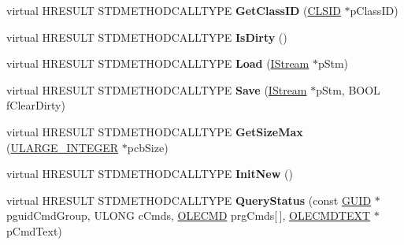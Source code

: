 \begin{DoxyCompactItemize}
virtual H\+R\+E\+S\+U\+LT S\+T\+D\+M\+E\+T\+H\+O\+D\+C\+A\+L\+L\+T\+Y\+PE {\bfseries Get\+Class\+ID} (\hyperlink{struct___i_i_d}{C\+L\+S\+ID} $\ast$p\+Class\+ID)
\item 
\mbox{\label{class_c_internet_toolbar_ae67d82daafd8635e99e35d1462e8556f}} 
virtual H\+R\+E\+S\+U\+LT S\+T\+D\+M\+E\+T\+H\+O\+D\+C\+A\+L\+L\+T\+Y\+PE {\bfseries Is\+Dirty} ()
\item 
\mbox{\label{class_c_internet_toolbar_a22c59293a91e78bcc59cdca388ca7ef0}} 
virtual H\+R\+E\+S\+U\+LT S\+T\+D\+M\+E\+T\+H\+O\+D\+C\+A\+L\+L\+T\+Y\+PE {\bfseries Load} (\hyperlink{interface_i_stream}{I\+Stream} $\ast$p\+Stm)
\item 
\mbox{\label{class_c_internet_toolbar_a1ae6e783bfb6a0529b7b99883f628749}} 
virtual H\+R\+E\+S\+U\+LT S\+T\+D\+M\+E\+T\+H\+O\+D\+C\+A\+L\+L\+T\+Y\+PE {\bfseries Save} (\hyperlink{interface_i_stream}{I\+Stream} $\ast$p\+Stm, B\+O\+OL f\+Clear\+Dirty)
\item 
\mbox{\label{class_c_internet_toolbar_ace9c52cd95b0420400b2323a06ad8465}} 
virtual H\+R\+E\+S\+U\+LT S\+T\+D\+M\+E\+T\+H\+O\+D\+C\+A\+L\+L\+T\+Y\+PE {\bfseries Get\+Size\+Max} (\hyperlink{struct___u_l_a_r_g_e___i_n_t_e_g_e_r}{U\+L\+A\+R\+G\+E\+\_\+\+I\+N\+T\+E\+G\+ER} $\ast$pcb\+Size)
\item 
\mbox{\label{class_c_internet_toolbar_a253d43cd5dd3ebb6351db91d7a01a946}} 
virtual H\+R\+E\+S\+U\+LT S\+T\+D\+M\+E\+T\+H\+O\+D\+C\+A\+L\+L\+T\+Y\+PE {\bfseries Init\+New} ()
\item 
\mbox{\label{class_c_internet_toolbar_a1a932f8a7f4de2aa79a952c1dc95c6e7}} 
virtual H\+R\+E\+S\+U\+LT S\+T\+D\+M\+E\+T\+H\+O\+D\+C\+A\+L\+L\+T\+Y\+PE {\bfseries Query\+Status} (const \hyperlink{interface_g_u_i_d}{G\+U\+ID} $\ast$pguid\+Cmd\+Group, U\+L\+O\+NG c\+Cmds, \hyperlink{struct_i_ole_command_target_1_1__tag_o_l_e_c_m_d}{O\+L\+E\+C\+MD} prg\+Cmds\mbox{[}$\,$\mbox{]}, \hyperlink{struct_i_ole_command_target_1_1__tag_o_l_e_c_m_d_t_e_x_t}{O\+L\+E\+C\+M\+D\+T\+E\+XT} $\ast$p\+Cmd\+Text)
\item 
\mbox{\label{class_c_internet_toolbar_a6ee0b392b78d843c6263bb905110142e}} 

\end{DoxyCompactItemize}
